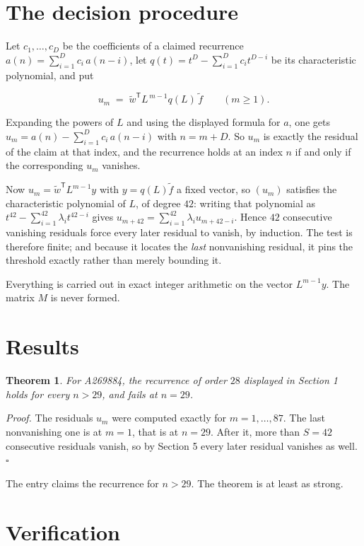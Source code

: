 \documentclass[11pt]{article}
\newtheorem{theorem}{Theorem}
\theoremstyle{definition}
\begin{document}
\section{The decision procedure}

Let $c_1,\dots,c_D$ be the coefficients of a claimed recurrence $a(n) = \sum_{i=1}^{D} c_i\,a(n-i)$, let $q(t) = t^{D} - \sum_{i=1}^{D} c_i t^{D-i}$ be its characteristic polynomial, and put

\[u_m \;=\; \tilde w^{\mathsf T} L^{\,m-1} q(L)\,\tilde f \qquad (m \ge 1).\]

Expanding the powers of $L$ and using the displayed formula for $a$, one gets $u_m = a(n) - \sum_{i=1}^{D} c_i\,a(n-i)$ with $n = m + D$. So $u_m$ is exactly the residual of the claim at that index, and the recurrence holds at an index $n$ if and only if the corresponding $u_m$ vanishes.

Now $u_m = \tilde w^{\mathsf T} L^{m-1} y$ with $y = q(L)\tilde f$ a fixed vector, so $(u_m)$ satisfies the characteristic polynomial of $L$, of degree $42$: writing that polynomial as $t^{42} - \sum_{i=1}^{42} \lambda_i t^{42-i}$ gives $u_{m+42} = \sum_{i=1}^{42} \lambda_i u_{m+42-i}$. Hence $42$ consecutive vanishing residuals force every later residual to vanish, by induction. The test is therefore finite; and because it locates the {\itshape last} nonvanishing residual, it pins the threshold exactly rather than merely bounding it.

Everything is carried out in exact integer arithmetic on the vector $L^{m-1}y$. The matrix $M$ is never formed.

\section{Results}

\begin{theorem} For A269884, the recurrence of order $28$ displayed in Section 1 holds for every $n > 29$, and fails at $n = 29$.\end{theorem}

{\itshape Proof.} The residuals $u_m$ were computed exactly for $m = 1,\dots,87$. The last nonvanishing one is at $m = 1$, that is at $n = 29$. After it, more than $S = 42$ consecutive residuals vanish, so by Section 5 every later residual vanishes as well. $\square$

The entry claims the recurrence for $n > 29$. The theorem is at least as strong.

\section{Verification}
\end{document}
